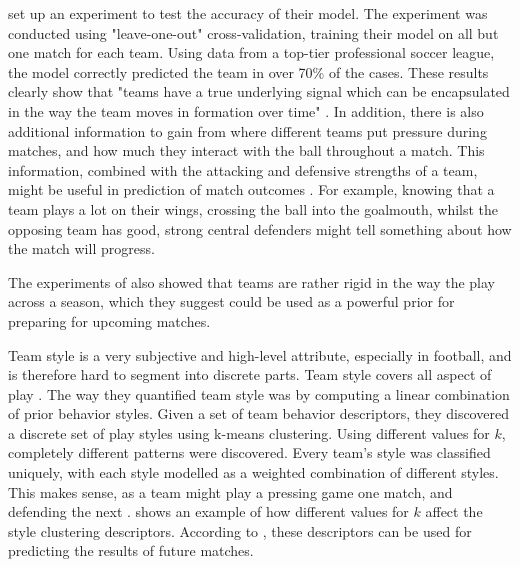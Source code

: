 \citet{bib:bialkowski-lucey-carr-yue-sridharan-matthews-2014} set up an experiment to test the accuracy of their model. The experiment was conducted using "leave-one-out" cross-validation, training their model on all but one match for each team. Using data from a top-tier professional soccer league, the model correctly predicted the team in over 70\% of the cases. These results clearly show that "teams have a true underlying signal which can be encapsulated in the way the team moves in formation over time" \citep{bib:bialkowski-lucey-carr-yue-sridharan-matthews-2014}. In addition, there is also additional information to gain from where different teams put pressure during matches, and how much they interact with the ball throughout a match. This information, combined with the attacking and defensive strengths of a team, might be useful in prediction of match outcomes \citep{bib:bialkowski-lucey-carr-yue-matthews-2014}. For example, knowing that a team plays a lot on their wings, crossing the ball into the goalmouth, whilst the opposing team has good, strong central defenders might tell something about how the match will progress.

The experiments of \citet{bib:bialkowski-lucey-carr-yue-sridharan-matthews-2014} also showed that teams are rather rigid in the way the play across a season, which they suggest could be used as a powerful prior for preparing for upcoming matches.

Team style is a very subjective and high-level attribute, especially in football, and is therefore hard to segment into discrete parts. Team style covers all aspect of play \citep{bib:bialkowski-lucey-carr-yue-sridharan-matthews-2014}. The way they quantified team style was by computing a linear combination of prior behavior styles. Given a set of team behavior descriptors, they discovered a discrete set of play styles using k-means clustering. Using different values for $k$, completely different patterns were discovered. Every team's style was classified uniquely, with each style modelled as a weighted combination of different styles. This makes sense, as a team might play a pressing game one match, and defending the next \citep{bib:bialkowski-lucey-carr-yue-sridharan-matthews-2014}.  shows an example of how different values for $k$ affect the style clustering descriptors. According to \citet{bib:bialkowski-lucey-carr-yue-sridharan-matthews-2014}, these descriptors can be used for predicting the results of future matches.

